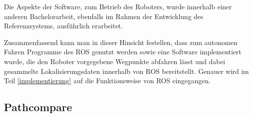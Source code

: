 Die Aspekte der Software, zum Betrieb des Roboters, wurde innerhalb einer anderen
Bachelorarbeit, ebenfalls im Rahmen der Entwicklung des Referenzsystems, ausführlich 
erarbeitet.

Zusammenfassend kann man in dieser Hinsicht festellen, dass zum autonomen Fahren
Programme des \gls{ROS} genutzt werden sowie eine Software implementiert wurde,
die den Roboter vorgegebene Wegpunkte abfahren lässt und dabei gesammelte
Lokalisierungsdaten innerhalb von \gls{ROS} bereitstellt. Genauer wird im Teil
\ref{implementierung} auf die Funktionsweise von \gls{ROS} eingegangen.

\subsection{Pathcompare}

